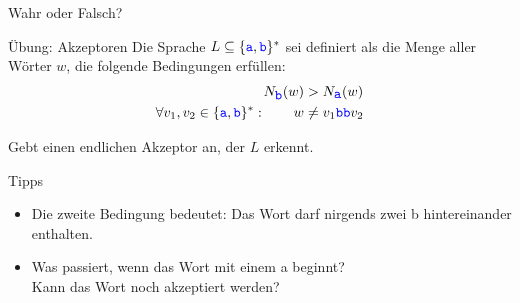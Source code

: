 \begin{frame}[t]{Wahr oder Falsch?}
	\medskip
	
\end{frame}








\begin{frame}{Übung: Akzeptoren}
	Die Sprache $L\subseteq \{\hbox{\textcolor{blue}{\texttt{a}}},\hbox{\textcolor{blue}{\texttt{b}}}\}^\ast $ sei definiert als die Menge aller Wörter $w$, die folgende Bedingungen erfüllen:
	\begin{align*}
	N_{\hbox{\textcolor{blue}{\texttt{b}}}}(w) &> N_{\hbox{\textcolor{blue}{\texttt{a}}}}(w)\\ 
	\forall v_1,v_2 \in \{\hbox{\textcolor{blue}{\texttt{a}}},\hbox{\textcolor{blue}{\texttt{b}}}\}^\ast : \qquad w &\neq v_1 \hbox{\textcolor{blue}{\texttt{bb}}} v_2 
	\end{align*}
	
	Gebt einen endlichen Akzeptor an, der $L$ erkennt. \\
	
	\bigskip
	\pause
	\begin{block}{Tipps}
		\begin{itemize}[<+->]
			\item Die zweite Bedingung bedeutet: Das Wort darf nirgends zwei \word b hintereinander enthalten.
			\item Was passiert, wenn das Wort mit einem \word a beginnt?\\
			Kann das Wort noch akzeptiert werden?
		\end{itemize}
	\end{block}
\end{frame}

